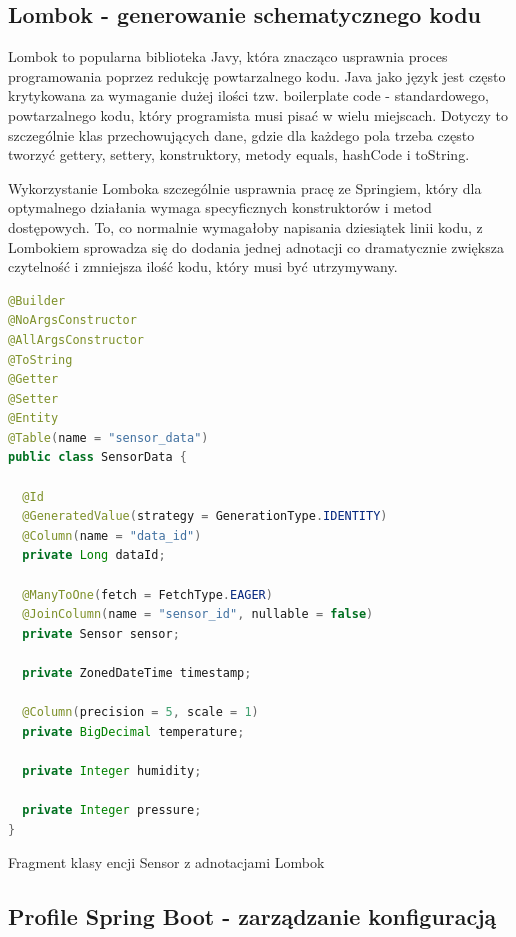 \documentclass[a4paper,12pt,openany]{book}
\begin{document}
\vspace{2cm}

\subsection*{Lombok - generowanie schematycznego kodu}

Lombok to popularna biblioteka Javy, która znacząco usprawnia proces programowania poprzez redukcję powtarzalnego kodu. Java jako język jest często krytykowana za wymaganie dużej ilości tzw. boilerplate code - standardowego, powtarzalnego kodu, który programista musi pisać w wielu miejscach. Dotyczy to szczególnie klas przechowujących dane, gdzie dla każdego pola trzeba często tworzyć gettery, settery, konstruktory, metody equals, hashCode i toString.

Wykorzystanie Lomboka szczególnie usprawnia pracę ze Springiem, który dla optymalnego działania wymaga specyficznych konstruktorów i metod dostępowych. To, co normalnie wymagałoby napisania dziesiątek linii kodu, z Lombokiem sprowadza się do dodania jednej adnotacji co dramatycznie zwiększa czytelność i zmniejsza ilość kodu, który musi być utrzymywany.

\begin{lstfloat}[htbp]
\begin{lstlisting}[language=java]
@Builder
@NoArgsConstructor
@AllArgsConstructor
@ToString
@Getter
@Setter
@Entity
@Table(name = "sensor_data")
public class SensorData {

  @Id
  @GeneratedValue(strategy = GenerationType.IDENTITY)
  @Column(name = "data_id")
  private Long dataId;

  @ManyToOne(fetch = FetchType.EAGER)
  @JoinColumn(name = "sensor_id", nullable = false)
  private Sensor sensor;

  private ZonedDateTime timestamp;

  @Column(precision = 5, scale = 1)
  private BigDecimal temperature;

  private Integer humidity;

  private Integer pressure;
}
\end{lstlisting}
\caption{Fragment klasy encji Sensor z adnotacjami Lombok}
\label{lst:lombok}
\end{lstfloat}
\vfill

\vspace{2cm}

\subsection*{Profile Spring Boot - zarządzanie konfiguracją}
\end{document}
